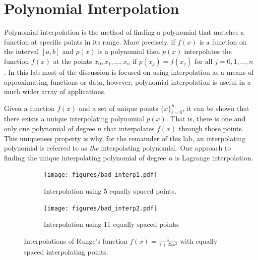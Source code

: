 \label{lab:Polynomial Interpolation}

\section*{Polynomial Interpolation}
Polynomial interpolation is the method of finding a polynomial that matches a function at specific points in its range.
More precisely, if $f(x)$ is a function on the interval $[a,b]$ and $p(x)$ is a polynomial then $p(x)$ interpolates the function $f(x)$ at the points $x_0,x_1,\dots ,x_n$ if $p(x_j)=f(x_j)$ for all $j=0,1,\dots,n$.
In this lab most of the discussion is focused on using interpolation as a means of approximating functions or data, however, polynomial interpolation is useful in a much wider array of applications.

Given a function $f(x)$ and a set of unique points $\{x\}_{i=0}^n$, it can be shown that there exists a unique interpolating polynomial $p(x)$.
That is, there is one and only one polynomial of degree $n$ that interpolates $f(x)$ through those points.
This uniqueness property is why, for the remainder of this lab, an interpolating polynomial is referred to as \emph{the} interpolating polynomial.
One approach to finding the unique interpolating polynomial of degree $n$ is Lagrange interpolation.

\begin{figure}
\captionsetup[subfigure]{justification=centering}
\captionsetup{justification=centering}
\centering
\begin{subfigure}{.5\textwidth}
    \centering
    \texttt{[image: figures/bad\_interp1.pdf]}
    \caption{Interpolation using 5 equally spaced points.}
    \label{fig:bad1}
\end{subfigure}%
\begin{subfigure}{.5\textwidth}
    \centering
    \texttt{[image: figures/bad\_interp2.pdf]}
    \caption{Interpolation using 11 equally spaced points.}
    \label{fig:bad2}
\end{subfigure}
\caption{Interpolations of Runge's function $f(x)=\frac{1}{1+25x^2}$ with equally spaced interpolating points.}
\label{fig:badinterp}
\end{figure}


